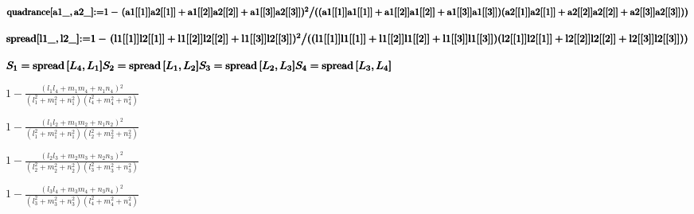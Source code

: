 \documentclass{article}
\begin{document}
\begin{doublespace}
\noindent\(\pmb{\text{quadrance}[\text{a1$\_$},\text{a2$\_$}]\text{:=} }\\
\pmb{1 - \left.(\text{a1}[[1]]\text{a2}[[1]]+\text{a1}[[2]]\text{a2}[[2]]+\text{a1}[[3]]\text{a2}[[3]])^2\right/}\\
\pmb{((\text{a1}[[1]]\text{a1}[[1]]+\text{a1}[[2]]\text{a1}[[2]]+\text{a1}[[3]]\text{a1}[[3]])(\text{a2}[[1]]\text{a2}[[1]]+\text{a2}[[2]]\text{a2}[[2]]+\text{a2}[[3]]\text{a2}[[3]]))}\)
\end{doublespace}

\begin{doublespace}
\noindent\(\pmb{\text{spread}[\text{l1$\_$},\text{l2$\_$}]\text{:=} }\\
\pmb{1 - \left.(\text{l1}[[1]]\text{l2}[[1]]+\text{l1}[[2]]\text{l2}[[2]]+\text{l1}[[3]]\text{l2}[[3]])^2\right/}\\
\pmb{((\text{l1}[[1]]\text{l1}[[1]]+\text{l1}[[2]]\text{l1}[[2]]+\text{l1}[[3]]\text{l1}[[3]])(\text{l2}[[1]]\text{l2}[[1]]+\text{l2}[[2]]\text{l2}[[2]]+\text{l2}[[3]]\text{l2}[[3]]))}\)
\end{doublespace}

\begin{doublespace}
\noindent\(\pmb{S_1=\text{spread}\left[L_4,L_1\right]}\\
\pmb{S_2=\text{spread}\left[L_1,L_2\right]}\\
\pmb{S_3=\text{spread}\left[L_2,L_3\right]}\\
\pmb{S_4=\text{spread}\left[L_3,L_4\right]}\)
\end{doublespace}

\begin{doublespace}
\noindent\(1-\frac{\left(l_1 l_4+m_1 m_4+n_1 n_4\right){}^2}{\left(l_1^2+m_1^2+n_1^2\right) \left(l_4^2+m_4^2+n_4^2\right)}\)
\end{doublespace}

\begin{doublespace}
\noindent\(1-\frac{\left(l_1 l_2+m_1 m_2+n_1 n_2\right){}^2}{\left(l_1^2+m_1^2+n_1^2\right) \left(l_2^2+m_2^2+n_2^2\right)}\)
\end{doublespace}

\begin{doublespace}
\noindent\(1-\frac{\left(l_2 l_3+m_2 m_3+n_2 n_3\right){}^2}{\left(l_2^2+m_2^2+n_2^2\right) \left(l_3^2+m_3^2+n_3^2\right)}\)
\end{doublespace}

\begin{doublespace}
\noindent\(1-\frac{\left(l_3 l_4+m_3 m_4+n_3 n_4\right){}^2}{\left(l_3^2+m_3^2+n_3^2\right) \left(l_4^2+m_4^2+n_4^2\right)}\)
\end{doublespace}
\end{document}
